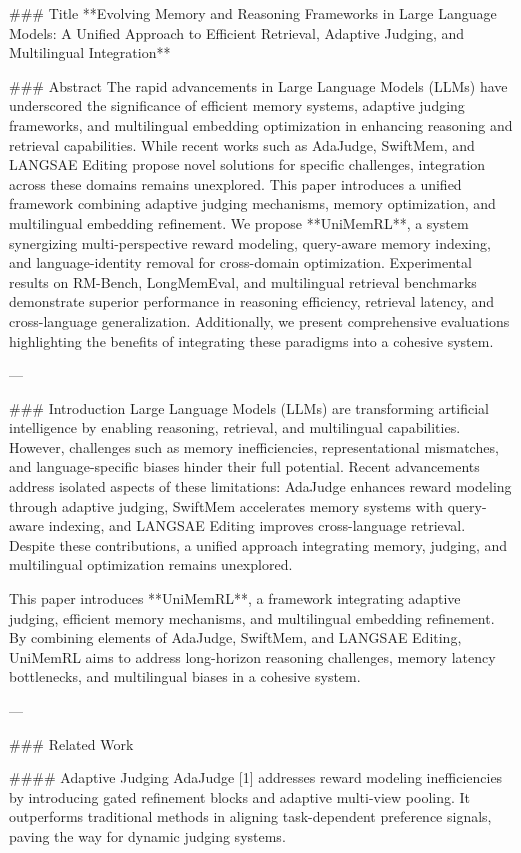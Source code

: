 ### Title  
**Evolving Memory and Reasoning Frameworks in Large Language Models: A Unified Approach to Efficient Retrieval, Adaptive Judging, and Multilingual Integration**  

### Abstract  
The rapid advancements in Large Language Models (LLMs) have underscored the significance of efficient memory systems, adaptive judging frameworks, and multilingual embedding optimization in enhancing reasoning and retrieval capabilities. While recent works such as AdaJudge, SwiftMem, and LANGSAE Editing propose novel solutions for specific challenges, integration across these domains remains unexplored. This paper introduces a unified framework combining adaptive judging mechanisms, memory optimization, and multilingual embedding refinement. We propose **UniMemRL**, a system synergizing multi-perspective reward modeling, query-aware memory indexing, and language-identity removal for cross-domain optimization. Experimental results on RM-Bench, LongMemEval, and multilingual retrieval benchmarks demonstrate superior performance in reasoning efficiency, retrieval latency, and cross-language generalization. Additionally, we present comprehensive evaluations highlighting the benefits of integrating these paradigms into a cohesive system.  

---

### Introduction  
Large Language Models (LLMs) are transforming artificial intelligence by enabling reasoning, retrieval, and multilingual capabilities. However, challenges such as memory inefficiencies, representational mismatches, and language-specific biases hinder their full potential. Recent advancements address isolated aspects of these limitations: AdaJudge enhances reward modeling through adaptive judging, SwiftMem accelerates memory systems with query-aware indexing, and LANGSAE Editing improves cross-language retrieval. Despite these contributions, a unified approach integrating memory, judging, and multilingual optimization remains unexplored.  

This paper introduces **UniMemRL**, a framework integrating adaptive judging, efficient memory mechanisms, and multilingual embedding refinement. By combining elements of AdaJudge, SwiftMem, and LANGSAE Editing, UniMemRL aims to address long-horizon reasoning challenges, memory latency bottlenecks, and multilingual biases in a cohesive system.  

---

### Related Work  

#### Adaptive Judging  
AdaJudge [1] addresses reward modeling inefficiencies by introducing gated refinement blocks and adaptive multi-view pooling. It outperforms traditional methods in aligning task-dependent preference signals, paving the way for dynamic judging systems.  

